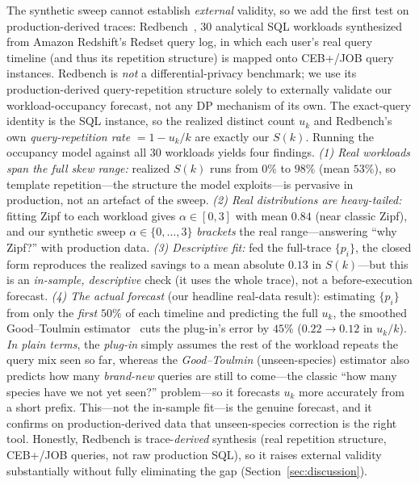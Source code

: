 \documentclass[sigconf,nonacm]{acmart}
\begin{document}
The synthetic sweep cannot establish \emph{external} validity, so we add the first test on production-derived traces: Redbench~\cite{redbench2025}, 30 analytical SQL workloads synthesized from Amazon Redshift's Redset query log, in which each user's real query timeline (and thus its repetition structure) is mapped onto CEB+/JOB query instances. Redbench is \emph{not} a differential-privacy benchmark; we use its production-derived query-repetition structure solely to externally validate our workload-occupancy forecast, not any DP mechanism of its own. The exact-query identity is the SQL instance, so the realized distinct count $u_k$ and Redbench's own \emph{query-repetition rate} $=1-u_k/k$ are exactly our $S(k)$. Running the occupancy model against all 30 workloads yields four findings.
\emph{(1) Real workloads span the full skew range:} realized $S(k)$ runs from $0\%$ to $98\%$ (mean $53\%$), so template repetition---the structure the model exploits---is pervasive in production, not an artefact of the sweep.
\emph{(2) Real distributions are heavy-tailed:} fitting Zipf to each workload gives $\alpha\in[0,3]$ with mean $0.84$ (near classic Zipf), and our synthetic sweep $\alpha\in\{0,\dots,3\}$ \emph{brackets} the real range---answering ``why Zipf?'' with production data.
\emph{(3) Descriptive fit:} fed the full-trace $\{p_i\}$, the closed form reproduces the realized savings to a mean absolute $0.13$ in $S(k)$---but this is an \emph{in-sample, descriptive} check (it uses the whole trace), not a before-execution forecast.
\emph{(4) The actual forecast} (our headline real-data result): estimating $\{p_i\}$ from only the \emph{first $50\%$} of each timeline and predicting the full $u_k$, the smoothed Good--Toulmin estimator~\cite{orlitsky2016unseen} cuts the plug-in's error by $45\%$ ($0.22\!\to\!0.12$ in $u_k/k$). \emph{In plain terms}, the \emph{plug-in} simply assumes the rest of the workload repeats the query mix seen so far, whereas the \emph{Good--Toulmin} (unseen-species) estimator also predicts how many \emph{brand-new} queries are still to come---the classic ``how many species have we not yet seen?'' problem---so it forecasts $u_k$ more accurately from a short prefix. This---not the in-sample fit---is the genuine forecast, and it confirms on production-derived data that unseen-species correction is the right tool. Honestly, Redbench is trace-\emph{derived} synthesis (real repetition structure, CEB+/JOB queries, not raw production SQL), so it raises external validity substantially without fully eliminating the gap (Section~\ref{sec:discussion}).
\end{document}
